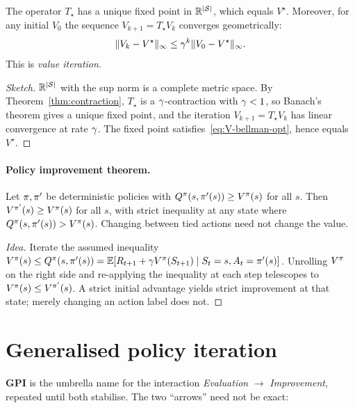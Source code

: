 \documentclass[11pt,oneside]{scrbook}
\begin{document}
\begin{corollary}
The operator $T_\star$ has a unique fixed point in $\mathbb{R}^{|\mathcal{S}|}$, which
equals $V^\star$. Moreover, for any initial $V_0$ the sequence $V_{k+1} = T_\star V_k$
converges geometrically:
\[
\|V_k - V^\star\|_\infty \le \gamma^k\|V_0 - V^\star\|_\infty.
\]
This is \emph{value iteration}.
\end{corollary}

\begin{proof}[Sketch]
$\mathbb{R}^{|\mathcal{S}|}$ with the sup norm is a complete metric space. By
Theorem~\ref{thm:contraction}, $T_\star$ is a $\gamma$-contraction with
$\gamma<1$, so Banach's theorem gives a unique fixed point, and the iteration
$V_{k+1} = T_\star V_k$ has linear convergence at rate $\gamma$. The fixed point
satisfies~\eqref{eq:V-bellman-opt}, hence equals $V^\star$. \qedhere
\end{proof}

\paragraph{Policy improvement theorem.}
\begin{theorem}
Let $\pi, \pi'$ be deterministic policies with
$Q^\pi(s, \pi'(s)) \ge V^\pi(s)$ for all $s$. Then
$V^{\pi'}(s) \ge V^\pi(s)$ for all $s$, with strict inequality at any
state where $Q^\pi(s,\pi'(s))>V^\pi(s)$. Changing between
tied actions need not change the value.
\end{theorem}

\begin{proof}[Idea]
Iterate the assumed inequality $V^\pi(s) \le Q^\pi(s,\pi'(s)) =
\mathbb{E}[R_{t+1} + \gamma V^\pi(S_{t+1})\mid S_t=s, A_t=\pi'(s)]$. Unrolling
$V^\pi$ on the right side and re-applying the inequality at each step
telescopes to $V^\pi(s) \le V^{\pi'}(s)$. A strict initial advantage yields strict improvement at that state;
merely changing an action label does not. \qedhere
\end{proof}

\section{Generalised policy iteration}

\textbf{GPI} is the umbrella name for the interaction
\textit{Evaluation} $\to$ \textit{Improvement}, repeated until both stabilise.
The two ``arrows'' need not be exact:
\end{document}
